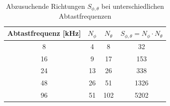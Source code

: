 \begin{table}[h]
     \center
     \begin{tabular}{cccc }
     \hline
          Abtastfrequenz [kHz] & $N_{\phi}$ & $N_{\theta}$ & $S_{\phi,\theta} = N_{\phi} \cdot N_{\theta}$\\
           \hline \hline
          8                    & 4            & 8                & 32    \\
          16                   & 9            & 17               & 153    \\
          24                   & 13           & 26               & 338    \\
          48                   & 26           & 51               & 1326    \\
          96                   & 51           & 102              & 5202    \\
         \hline
     \end{tabular}
  \caption{Abzusuchende Richtungen $S_{\phi,\theta}$ bei unterschiedlichen Abtastfrequenzen}
 \label{tab:Winkelanzahl_Abtastfrequenz}
 \end{table}






